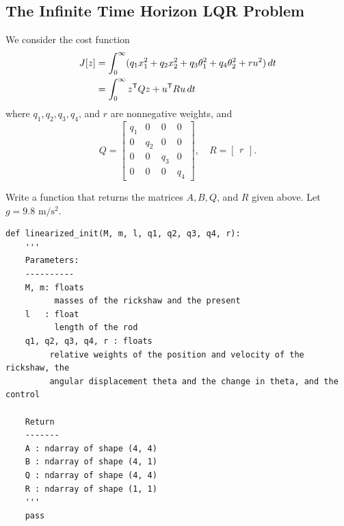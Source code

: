 \subsection*{The Infinite Time Horizon LQR Problem}
We consider the cost function
\begin{align}
\begin{split}
J[z] &= \int_0^{\infty} (q_1x_1^2 + q_2x_2^2  + q_3\theta_1^2 + q_4\theta_2^2 + ru^2)\, dt\\
&= \int_0^{\infty} z^{\mathsf T} Qz + u^{\mathsf T} Ru \, dt
\end{split} \label{inverted_pendulum:LQR}
\end{align}
where $q_1, q_2, q_3, q_4$, and $r$ are nonnegative weights, and
\[
Q =
\begin{bmatrix}
q_1 & 0 & 0 & 0 \\
0 & q_2 & 0 & 0\\
0 & 0 & q_3 & 0 \\
0 & 0 & 0 & q_4
\end{bmatrix}, \quad R = \begin{bmatrix} r \end{bmatrix}.
\]

\begin{problem}
Write a function that returns the matrices $A, B, Q$, and $R$ given above. Let $g = 9.8\text{ m}/\text{s}^2$.

\begin{lstlisting}
def linearized_init(M, m, l, q1, q2, q3, q4, r):
	'''
	Parameters:
	----------
	M, m: floats
          masses of the rickshaw and the present
	l 	: float
          length of the rod
	q1, q2, q3, q4, r : floats
         relative weights of the position and velocity of the rickshaw, the
		 angular displacement theta and the change in theta, and the control

	Return
	-------
	A : ndarray of shape (4, 4)
	B : ndarray of shape (4, 1)
	Q : ndarray of shape (4, 4)
	R : ndarray of shape (1, 1)
	'''
	pass
\end{lstlisting}
\end{problem}

